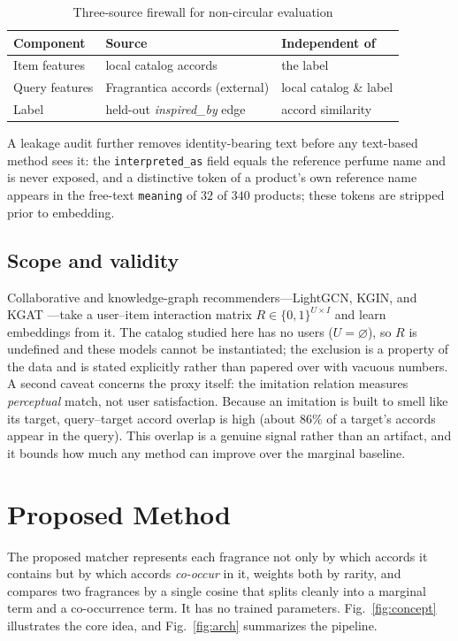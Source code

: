 \documentclass[conference]{IEEEtran}
\begin{document}
\begin{table}[htbp]
\caption{Three-source firewall for non-circular evaluation}
\begin{center}
\begin{tabular}{lll}
\toprule
\textbf{Component} & \textbf{Source} & \textbf{Independent of} \\
\midrule
Item features  & local catalog accords        & the label \\
Query features & Fragrantica accords (external) & local catalog \& label \\
Label          & held-out \textit{inspired\_by} edge & accord similarity \\
\bottomrule
\end{tabular}
\label{tab:firewall}
\end{center}
\end{table}

A leakage audit further removes identity-bearing text before any text-based method sees it:
the \texttt{interpreted\_as} field equals the reference perfume name and is never exposed,
and a distinctive token of a product's own reference name appears in the free-text
\texttt{meaning} of $32$ of $340$ products; these tokens are stripped prior to embedding.

\subsection{Scope and validity}
Collaborative and knowledge-graph recommenders---LightGCN, KGIN, and KGAT \cite{r20}---take
a user--item interaction matrix $R\in\{0,1\}^{U\times I}$ and learn embeddings from it. The
catalog studied here has no users ($U=\varnothing$), so $R$ is undefined and these models
cannot be instantiated; the exclusion is a property of the data and is stated explicitly
rather than papered over with vacuous numbers. A second caveat concerns the proxy itself:
the imitation relation measures \emph{perceptual} match, not user satisfaction. Because an
imitation is built to smell like its target, query--target accord overlap is high (about
$86\%$ of a target's accords appear in the query). This overlap is a genuine signal rather
than an artifact, and it bounds how much any method can improve over the marginal baseline.

\section{Proposed Method}\label{sec:method}
The proposed matcher represents each fragrance not only by which accords it contains
but by which accords \emph{co-occur} in it, weights both by rarity, and compares two
fragrances by a single cosine that splits cleanly into a marginal term and a
co-occurrence term. It has no trained parameters. Fig.~\ref{fig:concept} illustrates the
core idea, and Fig.~\ref{fig:arch} summarizes the pipeline.
\end{document}
